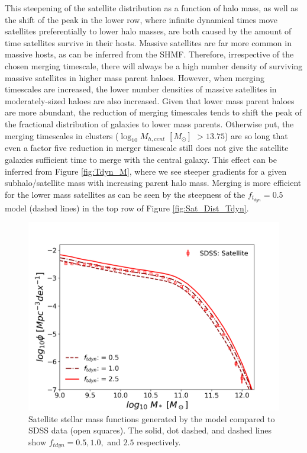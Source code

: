 This steepening of the satellite distribution as a function of halo mass, as well as the shift of the peak in the lower row, where infinite dynamical times move satellites preferentially to lower halo masses, are both caused by the amount of time satellites survive in their hosts. Massive satellites are far more common in massive hosts, as can be inferred from the SHMF. Therefore, irrespective of the chosen merging timescale, there will always be a high number density of surviving massive satellites in higher mass parent haloes. However, when merging timescales are increased, the lower number densities of massive satellites in moderately-sized haloes are also increased. Given that lower mass parent haloes are more abundant, the reduction of merging timescales tends to shift the peak of the fractional distribution of galaxies to lower mass parents. Otherwise put, the merging timescales in clusters ($ \log_{10} M_{h,cent}$ $[M_{\odot}]$ $> 13.75$) are so long that even a factor five reduction in merger timescale still does not give the satellite galaxies sufficient time to merge with the central galaxy. This effect can be inferred from Figure \ref{fig:Tdyn_M}, where we see steeper gradients for a given subhalo/satellite mass with increasing parent halo mass. Merging is more efficient for the lower mass satellites as can be seen by the steepness of the $f_{t_{dyn}} = 0.5$ model (dashed lines) in the top row of Figure \ref{fig:Sat_Dist_Tdyn}.


\begin{figure}[h]
	\centering
	\includegraphics[width = \linewidth]{Figures/Chapter3/Tdyn_SMF.png}
	\caption{Satellite stellar mass functions generated by the model compared to SDSS data (open squares). The solid, dot dashed, and dashed lines show $f_{tdyn} = 0.5, 1.0,$ and $2.5$ respectively.}
	\label{fig:SMF_Tdyn}
\end{figure}

